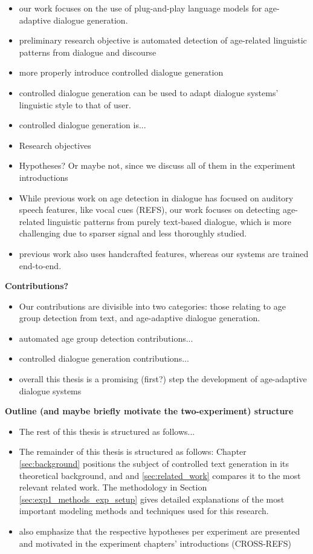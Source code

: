 \begin{itemize}
    \item our work focuses on the use of plug-and-play language models for age-adaptive dialogue generation.
    \item preliminary research objective is automated detection of age-related linguistic patterns from dialogue and discourse
    \item more properly introduce controlled dialogue generation
    \item controlled dialogue generation can be used to adapt dialogue systems' linguistic style to that of user.
    \item controlled dialogue generation is...
    \item Research objectives
    \item Hypotheses? Or maybe not, since we discuss all of them in the experiment introductions
    \item While previous work on age detection in dialogue has focused on auditory speech features, like vocal cues (REFS), our work focuses on detecting age-related linguistic patterns from purely text-based dialogue, which is more challenging due to sparser signal and less thoroughly studied.
    \item previous work also uses handcrafted features, whereas our systems are trained end-to-end.
\end{itemize}

\textbf{Contributions?}
\begin{itemize}
    \item Our contributions are divisible into two categories: those relating to age group detection from text, and age-adaptive dialogue generation.
    \item automated age group detection contributions...
    \item controlled dialogue generation contributions...
    \item overall this thesis is a promising (first?) step the development of age-adaptive dialogue systems
\end{itemize}

\textbf{Outline (and maybe briefly motivate the two-experiment) structure}
\begin{itemize}
    \item The rest of this thesis is structured as follows...
    \item {}The remainder of this thesis is structured as follows: Chapter \ref{sec:background} positions the subject of controlled text generation in its theoretical background, and and \ref{sec:related_work} compares it to the most relevant related work. The methodology in Section \ref{sec:exp1_methods_exp_setup} gives detailed explanations of the most important modeling methods and techniques used for this research. 
    \item also emphasize that the respective hypotheses per experiment are presented and motivated in the experiment chapters' introductions (CROSS-REFS)
\end{itemize}


